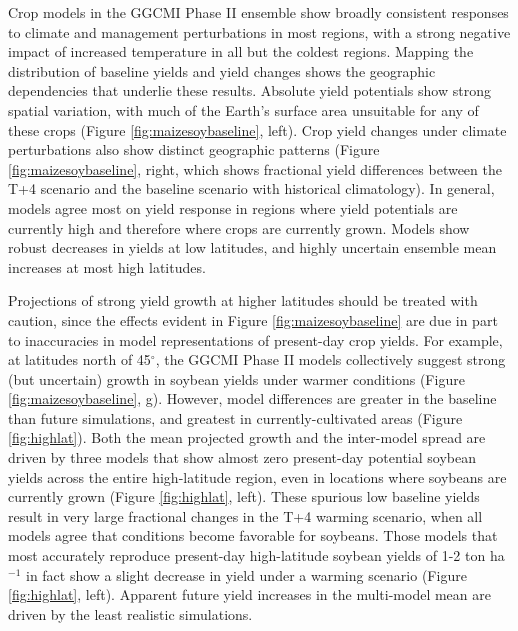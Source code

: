 \documentclass[gmd, manuscript]{copernicus} %
\begin{document}
Crop models in the GGCMI Phase II ensemble show broadly consistent responses to climate and management perturbations in most regions, with a strong negative impact of increased temperature in all but the coldest regions. 
Mapping the distribution of baseline yields and yield changes shows the geographic dependencies that underlie these results. 
Absolute yield potentials show strong spatial variation, with much of the Earth's surface area unsuitable for any of these crops (Figure \ref{fig:maizesoybaseline}, left).
Crop yield changes under climate perturbations also show distinct geographic patterns (Figure \ref{fig:maizesoybaseline}, right, which shows fractional yield differences between the T+4 scenario and the baseline scenario with historical climatology).
In general, models agree most on yield response in regions where yield potentials are currently high and therefore where crops are currently grown. 
Models show robust decreases in yields at low latitudes, and highly uncertain ensemble mean increases at most high latitudes.

Projections of strong yield growth at higher latitudes should be treated with caution, since the effects evident in Figure \ref{fig:maizesoybaseline} are due in part to inaccuracies in model representations of present-day crop yields. 
For example, at latitudes north of 45$^\circ$, the GGCMI Phase II models collectively suggest strong (but uncertain) growth in soybean yields under warmer conditions (Figure \ref{fig:maizesoybaseline}, g). 
However, model differences are greater in the baseline than future simulations, and greatest in currently-cultivated areas (Figure \ref{fig:highlat}). 
Both the mean projected growth and the inter-model spread are driven by three models that show almost zero present-day potential soybean yields across the entire high-latitude region, even in locations where soybeans are currently grown (Figure \ref{fig:highlat}, left). 
These spurious low baseline yields result in very large fractional changes in the T+4 warming scenario, when all models agree that conditions become favorable for soybeans. 
Those models that most accurately reproduce present-day high-latitude soybean yields of 1-2 ton ha$^{-1}$ \citep{Ray2012} in fact show a slight decrease in yield under a warming scenario (Figure \ref{fig:highlat}, left). 
Apparent future yield increases in the multi-model mean are driven by the least realistic simulations.
\end{document}

